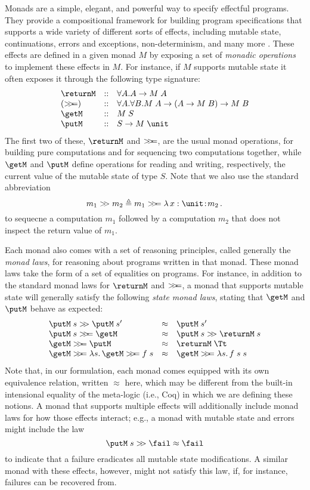 \documentclass[preprint]{sigplanconf}
\begin{document}
Monads are a simple, elegant, and powerful way to specify effectful programs.
They provide a compositional framework for building program specifications that
supports a wide variety of different sorts of effects, including mutable state,
continuations, errors and exceptions, non-determinism, and many more
\cite{moggi91}.  These effects are defined in a given monad $M$ by exposing a
set of \emph{monadic operations} to implement these effects in $M$. For
instance, if $M$ supports mutable state it often exposes it through the
following type signature:
\[
\begin{array}{lcl}
  \returnM & :: & \forall A. A \to M\;A \\
  (\bind) & :: & \forall A. \forall B. M\;A \to (A\to M\;B) \to M\;B \\
  \getM & :: & M\;S \\
  \putM & :: & S \to M\;\unit
\end{array}
\]
The first two of these, $\returnM$ and $>\!\!>\!\!=$, are the usual monad operations,
for building pure computations and for sequencing two computations together,
while $\getM$ and $\putM$ define operations for reading and writing,
respectively, the current value of the mutable state of type $S$. Note that
we also use the standard abbreviation
\[
m_1 \bindU m_2 \triangleq m_1 \bind \lamabs{x:\unit}{m_2}
\]
to sequecne a computation $m_1$ followed by a computation $m_2$ that does not
inspect the return value of $m_1$.


Each monad also comes with a set of reasoning principles, called generally the
\emph{monad laws}, for reasoning about programs written in that monad. These
monad laws take the form of a set of equalities on programs. For instance, in
addition to the standard monad laws for $\returnM$ and $>\!\!>\!\!=$, a monad that
supports mutable state will generally satisfy the following \emph{state monad
  laws}, stating that $\getM$ and $\putM$ behave as expected:
\[
\begin{array}{lcl}
  \putM\;s \bindU \putM\;s' & \approx & \putM\;s'\\
  \putM\;s \bind \getM & \approx & \putM\;s \bindU \returnM\;s \\
  \getM\bind\putM & \approx & \returnM\;\Tt \\
  \getM\bind \lamabsnot{s}{\getM\bind f\;s} & \approx & \getM\bind\lamabsnot{s}{f\;s\;s}
\end{array}
\]
Note that, in our formulation, each monad comes equipped with its own
equivalence relation, written $\approx$ here, which may be different from the
built-in intensional equality of the meta-logic (i.e., Coq) in which we are
defining these notions.
%
A monad that supports multiple effects will additionally include monad laws for
how those effects interact; e.g., a monad with mutable state and errors might
include the law
\[
\putM\;s \bindU \fail \approx \fail
\]
to indicate that a failure eradicates all mutable state modifications.  A
similar monad with these effects, however, might not satisfy this law, if, for
instance, failures can be recovered from.
\end{document}
